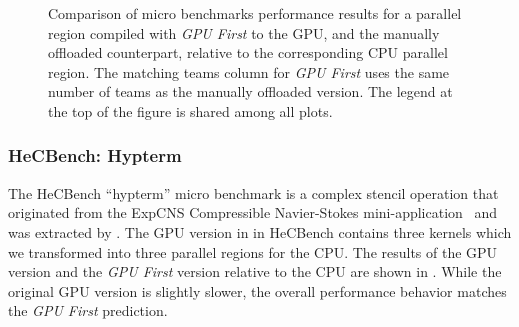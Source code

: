 \begin{figure}[htbp]
\vspace{-2mm}
\caption{
Comparison of micro benchmarks performance results for a parallel region compiled with \emph{GPU First} to the GPU, and the manually offloaded counterpart, relative to the corresponding CPU parallel region.
The matching teams column for \emph{GPU First} uses the same number of teams as the manually offloaded version.
The legend at the top of the figure is shared among all plots.
}
\label{fig:AAA}
    
\end{figure}

\subsubsection{HeCBench: Hypterm}

The HeCBench ``hypterm'' micro benchmark is a complex stencil operation that originated from the ExpCNS Compressible Navier-Stokes mini-application~\cite{ExaCT} and was extracted by \citet{DBLP:conf/ppopp/RawatRSPRS18}.
The GPU version in in HeCBench contains three kernels which we transformed into three parallel regions for the CPU.
The results of the GPU version and the \emph{GPU First} version relative to the CPU are shown in .
While the original GPU version is slightly slower, the overall performance behavior matches the \emph{GPU First} prediction.


